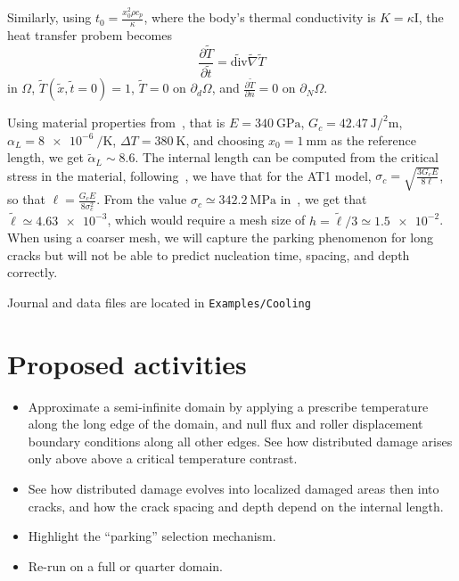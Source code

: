 \documentclass[10pt,oneside]{report}
\begin{document}
Similarly, using $t_0 = \frac{x_0^2\rho c_p}{\kappa}$, where the body's thermal conductivity is $K =\kappa \mathrm{I}$, the heat transfer probem becomes
$$
	\frac{\partial \tilde{T}}{\partial \tilde t} = \tilde{\mathrm{div}} \tilde{\nabla} \tilde{T}
$$ in $\Omega$, $\tilde{T}(\tilde{x},\tilde{t}=0) = 1$, $\tilde{T} = 0$ on $\partial_d\Omega$, and $\frac{\partial \tilde{T}}{\partial n} = 0$ on $\partial_N \Omega$.



Using material properties from~\cite{Bourdin-Marigo-EtAl-2014a}, that is $E=\SI{340}{\giga\pascal}$, $G_c = \SI{42.47}{\joule\per\squared\meter}$, $\alpha_L = \SI{8e-6}{\per\kelvin}$, $\Delta T = \SI{380}{\kelvin}$, and choosing $x_0=\SI{1}{\milli\meter}$ as the reference length, we get $\tilde{\alpha}_L \sim 8.6$. 
The internal length can be computed from the critical stress in the material, following~\cite{Pham-Marigo-EtAl-2011a}, we have that for the AT1 model, $\sigma_c = \sqrt{\frac{3G_cE}{8\ell}}$, so that $\ell = \frac{G_cE}{8\sigma_c^2}$. From the value $\sigma_c \simeq \SI{342.2}{\mega\pascal}$ in~\cite{Bourdin-Marigo-EtAl-2014a}, we get that $\tilde{\ell} \simeq \num{4.63e-3}$, which would require  a mesh size of $h = \tilde{\ell}/3 \simeq \num{1.5e-2}$.
When using a coarser mesh, we will capture the parking phenomenon for long cracks but will not be able to predict nucleation time, spacing, and depth correctly.


Journal and data files are located in  \verb+Examples/Cooling+

\section*{Proposed activities}
\begin{itemize}
\item Approximate a semi-infinite domain by applying a prescribe temperature along the long edge of the domain, and null flux and roller displacement boundary conditions along all other edges. See how distributed damage arises only above above a critical temperature contrast.
\item See how distributed damage evolves into localized damaged areas then into cracks, and how the crack spacing and depth depend on the internal length.
\item Highlight the ``parking'' selection mechanism.
\item Re-run on a full or quarter domain.
\end{itemize}
\end{document}
